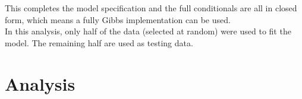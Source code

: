\documentclass{../../tex_template/asaproc}
\begin{document}
This completes the model specification and the full conditionals are all in closed
form, which means a fully Gibbs implementation can be used.\\

In this analysis, only half of the data (selected at random) were used to fit the
model. The remaining half are used as testing data.\\


\section{Analysis}
\end{document}
